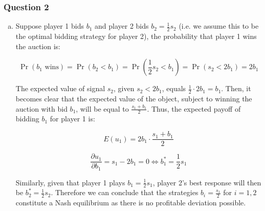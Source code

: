 \documentclass[a4paper]{article}
\begin{document}
\subsubsection{Question 2}
\begin{enumerate}[(a)]
\item
Suppose player 1 bids \(b_{1}\) and player 2 bids
\(b_{2} = \frac{1}{2}s_{2}\) (i.e. we assume this to be the optimal
bidding strategy for player 2), the probability that player 1 wins the
auction is:

\[\Pr\left( b_{1}\text{\ wins} \right) = \Pr\left( b_{2} < b_{1} \right) = \Pr\left( \frac{1}{2}s_{2} < b_{1} \right) = \Pr\left( s_{2} < 2b_{1} \right) = 2b_{1}\]


The expected value of signal \(s_{2}\), given \(s_{2} < 2b_{1}\), equals
\(\frac{1}{2} \cdot 2b_{1} = b_{1}\). Then, it becomes clear that the
expected value of the object, subject to winning the auction with bid
\(b_{1}\), will be equal to \(\frac{s_{1} + b_{1}}{2}\). Thus, the
expected payoff of bidding \(b_{1}\) for player 1 is:


\[E\left( u_{1} \right) = 2b_{1} \cdot \frac{s_{1} + b_{1}}{2}\]

\[ \frac{\partial u_1}{\partial b_1} = s_{1} - 2b_{1} = 0 \iff b_{1}^{*} = \frac{1}{2}s_{1}\]

Similarly, given that player 1 plays \(b_{1} = \frac{1}{2}s_{1}\),
player 2's best response will then be
\(b_{2}^{*} = \frac{1}{2}s_{2}\).
Therefore we can conclude that the strategies
\(b_{i} = \frac{s_{1}}{2}\) for \(i = 1,2\) constitute a Nash
equilibrium as there is no profitable deviation possible.


\end{enumerate}
\end{document}
